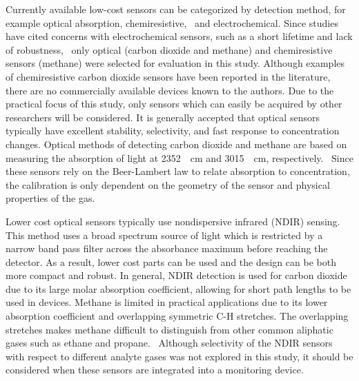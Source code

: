 \documentclass[times]{joehreview}
\begin{document}
	Currently available low-cost sensors can be categorized by detection method, for example optical absorption, chemiresistive,~\cite{wetchakun_semiconducting_2011} and electrochemical.  Since studies have cited concerns with electrochemical sensors, such as a short lifetime and lack of robustness,~\cite{neri_first_2015} only optical (carbon dioxide and methane) and chemiresistive sensors (methane) were selected for evaluation in this study.  Although examples of chemiresistive carbon dioxide sensors have been reported in the literature, there are no commercially available devices known to the authors.  Due to the practical focus of this study, only sensors which can easily be acquired by other researchers will be considered.  It is generally accepted that optical sensors typically have excellent stability, selectivity, and fast response to concentration changes.  Optical methods of detecting carbon dioxide and methane are based on measuring the absorption of light at \SI{2352}{\per\centi\meter} and \SI{3015}{\per\centi\meter}, respectively.~\cite{frodl_high-precision_2006,zhu_one_2012}  Since these sensors rely on the Beer-Lambert law to relate absorption to concentration, the calibration is only dependent on the geometry of the sensor and physical properties of the gas.~\cite{bacsik_ftir_2004}  
	
	Lower cost optical sensors typically use nondispersive infrared (NDIR) sensing.  This method uses a broad spectrum source of light which is restricted by a narrow band pass filter across the absorbance maximum before reaching the detector.  As a result, lower cost parts can be used and the design can be both more compact and robust.  In general, NDIR detection is used for carbon dioxide due to its large molar absorption coefficient, allowing for short path lengths to be used in devices.  Methane is limited in practical applications due to its lower absorption coefficient and overlapping symmetric C-H stretches.  The overlapping stretches makes methane difficult to distinguish from other common aliphatic gases such as ethane and propane.~\cite{coblentz_society_inc._evaluated_????}  Although selectivity of the NDIR sensors with respect to different analyte gases was not explored in this study, it should be considered when these sensors are integrated into a monitoring device. 
	
\end{document}
